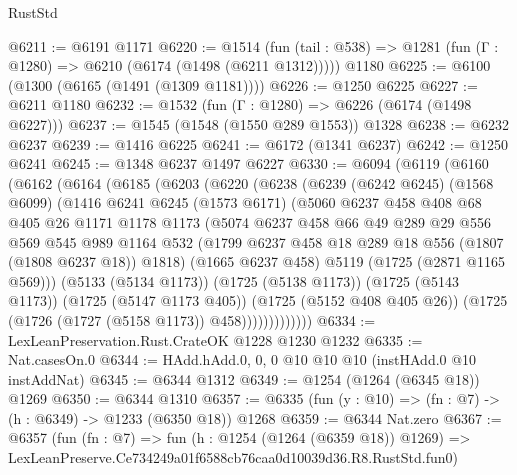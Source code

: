 \begin{lexlean}{RustStd}
\begin{coremodule}
@6211 := @6191 @1171
@6220 := @1514
    (fun (tail : @538) => @1281 (fun (Γ : @1280) => @6210 (@6174 (@1498 (@6211 @1312)))))
    @1180
@6225 := @6100 (@1300 (@6165 (@1491 (@1309 @1181))))
@6226 := @1250 @6225
@6227 := @6211 @1180
@6232 := @1532 (fun (Γ : @1280) => @6226 (@6174 (@1498 @6227)))
@6237 := @1545 (@1548 (@1550 @289 @1553)) @1328
@6238 := @6232 @6237
@6239 := @1416 @6225
@6241 := @6172 (@1341 @6237)
@6242 := @1250 @6241
@6245 := @1348 @6237 @1497 @6227
@6330 := @6094
    (@6119
      (@6160
        (@6162
          (@6164
            (@6185
              (@6203
                (@6220
                  (@6238
                    (@6239
                      (@6242 @6245)
                      (@1568 @6099)
                      (@1416
                        @6241
                        @6245
                        (@1573 @6171)
                        (@5060
                          @6237
                          @458
                          @408
                          @68
                          @405
                          @26
                          @1171
                          @1178
                          @1173
                          (@5074
                            @6237
                            @458
                            @66
                            @49
                            @289
                            @29
                            @556
                            @569
                            @545
                            @989
                            @1164
                            @532
                            (@1799 @6237 @458 @18 @289 @18 @556 (@1807 (@1808 @6237 @18)) @1818)
                            (@1665 @6237 @458)
                            @5119
                            (@1725 (@2871 @1165 @569)))
                          (@5133 (@5134 @1173))
                          (@1725 (@5138 @1173))
                          (@1725 (@5143 @1173))
                          (@1725 (@5147 @1173 @405))
                          (@1725 (@5152 @408 @405 @26))
                          (@1725 (@1726 (@1727 (@5158 @1173)) @458)))))))))))))
@6334 := LexLeanPreservation.Rust.CrateOK @1228 @1230 @1232
@6335 := Nat.casesOn.{0}
@6344 := HAdd.hAdd.{0, 0, 0} @10 @10 @10 (instHAdd.{0} @10 instAddNat)
@6345 := @6344 @1312
@6349 := @1254 (@1264 (@6345 @18)) @1269
@6350 := @6344 @1310
@6357 := @6335 (fun (y : @10) => (fn : @7) -> (h : @6349) -> @1233 (@6350 @18)) @1268
@6359 := @6344 Nat.zero
@6367 := @6357
    (fun (fn : @7) =>
    fun (h : @1254 (@1264 (@6359 @18)) @1269) =>
    LexLeanPreserve.Ce734249a01f6588cb76caa0d10039d36.R8.RustStd.fun0)

\end{coremodule}
\end{lexlean}
